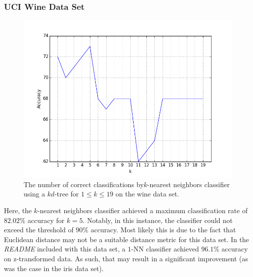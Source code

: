 \documentclass{article}
\numberwithin{figure}{section}
\newcommand{\imgwidth}{.8\textwidth}
\begin{document}
\subsubsection{UCI Wine Data Set}
\begin{figure}[H]
\centering
\includegraphics[width=\imgwidth]{knn_kd_wine}
\caption{The number of correct classifications by$k$-nearest neighbors classifier using a $kd$-tree for $1 \leq k \leq 19$ on the wine data set.}
\label{knn:kd:wine}
\end{figure}

Here, the $k$-nearest neighbors classifier achieved a maximum classification rate of $82.02\%$ accuracy for $k=5$. Notably, in this instance, the classifier could not exceed the threshold of $90\%$ accuracy. Most likely this is due to the fact that Euclidean distance may not be a suitable distance metric for this data set. In the \emph{README} included with this data set, a $1$-NN classifier achieved $96.1\%$ accuracy on z-transformed data. As such, that may result in a significant improvement (as was the case in the iris data set). 

\end{document}
